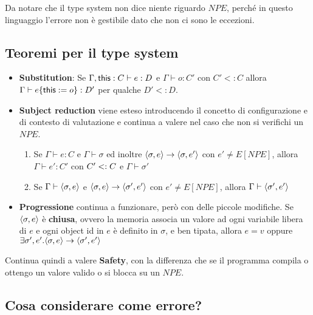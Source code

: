 \begin{prooftree}
\end{prooftree}

\noindent Da notare che il type system non dice niente riguardo $NPE$, perché in questo linguaggio l'errore non è gestibile dato che non ci sono le eccezioni.

\subsection{Teoremi per il type system}

\begin{itemize}
	\item \textbf{Substitution}: Se $\Gamma, \this : C \vdash e :D$ e $\Gamma \vdash o:C'$ con $C' <: C$ allora $\Gamma \vdash e\{\this := o \} : D'$ per qualche $D' <: D$.
	\item \textbf{Subject reduction} viene esteso introducendo il concetto di configurazione e di contesto di valutazione e continua a valere nel caso che non si verifichi un $NPE$.
	\begin{enumerate}
		\item Se $\Gamma \vdash e : C$ e $\Gamma \vdash \sigma$ ed inoltre $\LA \sigma,e\RA \to \LA\sigma, e'\RA$ con $e' \neq E[NPE]$, allora $\Gamma \vdash e' :C' $ con $C' \stype C$ e $\Gamma \vdash \sigma'$
		\item Se $\Gamma \vdash \LA \sigma, e\RA$ e $\LA \sigma, e\RA \to \LA \sigma', e'\RA $ con $e'\neq E[NPE]$, allora $\Gamma \vdash \LA \sigma', e'\RA$
	\end{enumerate}
	
	\item \textbf{Progressione} continua a funzionare, però con delle piccole modifiche.
	Se $\LA \sigma, e\RA$ è \textbf{chiusa}, ovvero la memoria associa un valore ad ogni variabile libera di $e$ e ogni object id in $e$ è definito in $\sigma$, e ben tipata, allora $e=v$ oppure $\exists \sigma',e' . \LA \sigma, e\RA \to \LA \sigma', e'\RA$
\end{itemize}

Continua quindi a valere \textbf{Safety}, con la differenza che se il programma compila o ottengo un valore valido o si blocca su un $NPE$. 

\subsection{Cosa considerare come errore?}

